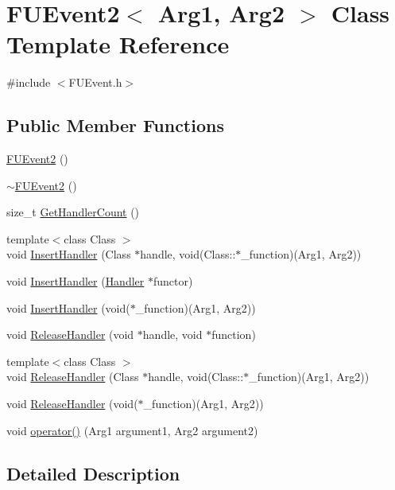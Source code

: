 \hypertarget{classFUEvent2}{
\section{FUEvent2$<$ Arg1, Arg2 $>$ Class Template Reference}
\label{classFUEvent2}
}


{\ttfamily \#include $<$FUEvent.h$>$}

\subsection*{Public Member Functions}
\begin{DoxyCompactItemize}
\item 
\hyperlink{classFUEvent2_aaa58c36d65bf730c930b74deb670234c}{FUEvent2} ()
\item 
\hyperlink{classFUEvent2_ade4ce3f5499b074b6c959725fe4e6ef5}{$\sim$FUEvent2} ()
\item 
size\_\-t \hyperlink{classFUEvent2_a8abbceb8babd882d62e722d8cecdf3ec}{GetHandlerCount} ()
\item 
{\footnotesize template$<$class Class $>$ }\\void \hyperlink{classFUEvent2_a0ab2de478c4cd37a69ec5b99e54baba9}{InsertHandler} (Class $\ast$handle, void(Class::$\ast$\_\-function)(Arg1, Arg2))
\item 
void \hyperlink{classFUEvent2_a9d46bbf9a04b4e19d2b09332212319f4}{InsertHandler} (\hyperlink{classIFunctor2}{Handler} $\ast$functor)
\item 
void \hyperlink{classFUEvent2_afe991947a6b5a87dc4143d73773906c6}{InsertHandler} (void($\ast$\_\-function)(Arg1, Arg2))
\item 
void \hyperlink{classFUEvent2_af5053eab49374825bc78a5d9c20f532f}{ReleaseHandler} (void $\ast$handle, void $\ast$function)
\item 
{\footnotesize template$<$class Class $>$ }\\void \hyperlink{classFUEvent2_a7ffd7ee797298381359d399bda3bfd7a}{ReleaseHandler} (Class $\ast$handle, void(Class::$\ast$\_\-function)(Arg1, Arg2))
\item 
void \hyperlink{classFUEvent2_a07871d2824a60959fe6e4d82f2c56f23}{ReleaseHandler} (void($\ast$\_\-function)(Arg1, Arg2))
\item 
void \hyperlink{classFUEvent2_aafb6133b005b9e917d9c5ab8b6bd6a05}{operator()} (Arg1 argument1, Arg2 argument2)
\end{DoxyCompactItemize}


\subsection{Detailed Description}
